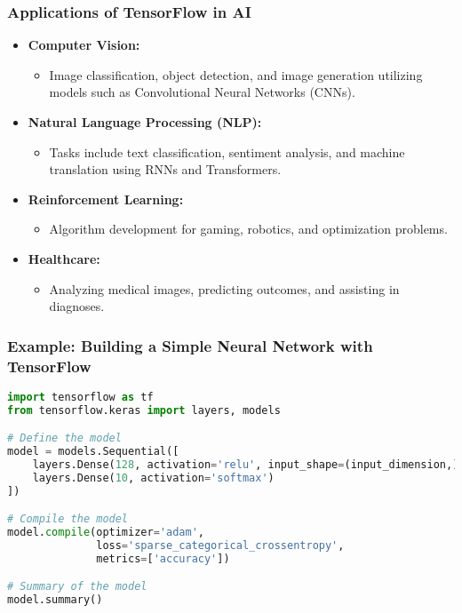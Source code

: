 \documentclass[aspectratio=169]{beamer}
\begin{document}
\begin{frame}[fragile]
    \frametitle{Applications of TensorFlow in AI}
    \begin{itemize}
        \item \textbf{Computer Vision:}
        \begin{itemize}
            \item Image classification, object detection, and image generation utilizing models such as Convolutional Neural Networks (CNNs).
        \end{itemize}
        
        \item \textbf{Natural Language Processing (NLP):}
        \begin{itemize}
            \item Tasks include text classification, sentiment analysis, and machine translation using RNNs and Transformers.
        \end{itemize}
        
        \item \textbf{Reinforcement Learning:}
        \begin{itemize}
            \item Algorithm development for gaming, robotics, and optimization problems.
        \end{itemize}

        \item \textbf{Healthcare:}
        \begin{itemize}
            \item Analyzing medical images, predicting outcomes, and assisting in diagnoses.
        \end{itemize}
    \end{itemize}
\end{frame}

\begin{frame}[fragile]
    \frametitle{Example: Building a Simple Neural Network with TensorFlow}
    \begin{lstlisting}[language=Python]
import tensorflow as tf
from tensorflow.keras import layers, models

# Define the model
model = models.Sequential([
    layers.Dense(128, activation='relu', input_shape=(input_dimension,)),
    layers.Dense(10, activation='softmax')
])

# Compile the model
model.compile(optimizer='adam', 
              loss='sparse_categorical_crossentropy', 
              metrics=['accuracy'])

# Summary of the model
model.summary()
    \end{lstlisting}
\end{frame}
\end{document}
